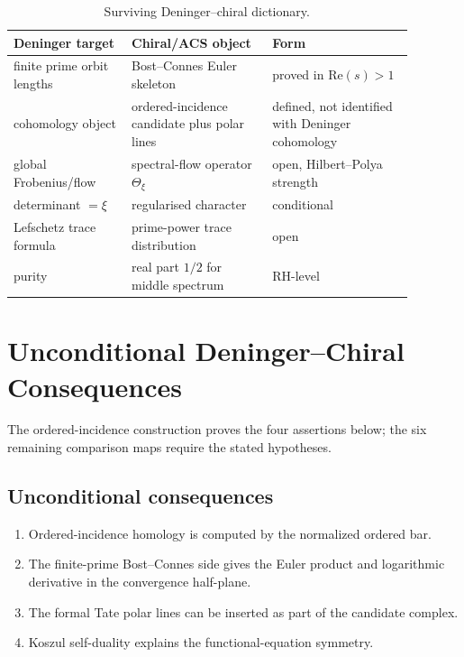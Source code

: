 \begin{table}[h]
\centering
\small
\begin{tabular}{p{0.26\linewidth}p{0.31\linewidth}p{0.31\linewidth}}
\toprule
Deninger target & Chiral/ACS object & Form \\
\midrule
finite prime orbit lengths & Bost--Connes Euler skeleton & proved in
\(\mathrm{Re}(s)>1\) \\
cohomology object & ordered-incidence candidate plus polar lines &
defined, not identified with Deninger cohomology \\
global Frobenius/flow & spectral-flow operator \(\Theta_\xi\) &
open, Hilbert--Polya strength \\
determinant \(=\xi\) & regularised character & conditional \\
Lefschetz trace formula & prime-power trace distribution & open \\
purity & real part \(1/2\) for middle spectrum & RH-level \\
\bottomrule
\end{tabular}
\caption{Surviving Deninger--chiral dictionary.}
\label{v4-arith:w8-a:table:triple}
\end{table}

\section{Unconditional Deninger--Chiral Consequences}
\label{v4-arith:w8-a:what-closes}

The ordered-incidence construction proves the four assertions below;
the six remaining comparison maps require the stated hypotheses.

\subsection*{Unconditional consequences}
\label{v4-arith:w8-a:what-closes:uncond}

\begin{enumerate}
\item Ordered-incidence homology is computed by the normalized ordered
bar.
\item The finite-prime Bost--Connes side gives the Euler product and
logarithmic derivative in the convergence half-plane.
\item The formal Tate polar lines can be inserted as part of the
candidate complex.
\item Koszul self-duality explains the functional-equation symmetry.
\end{enumerate}

